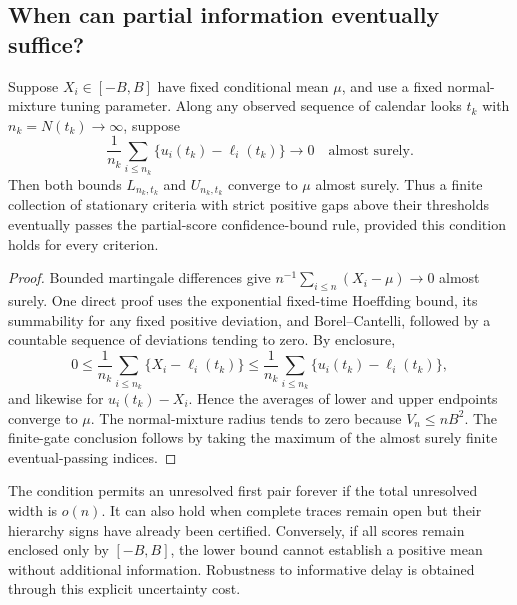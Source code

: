 \subsection{When can partial information eventually suffice?}

\begin{proposition}
\label{prop:async_consistency}
Suppose $X_i\in[-B,B]$ have fixed conditional mean $\mu$, and use a
fixed normal-mixture tuning parameter. Along any observed sequence of
calendar looks $t_k$ with $n_k=N(t_k)\to\infty$, suppose
\[
 \frac1{n_k}\sum_{i\leq n_k}
       \{u_i(t_k)-\ell_i(t_k)\}\longrightarrow0
 \quad\text{almost surely}.
\]
Then both bounds $L_{n_k,t_k}$ and $U_{n_k,t_k}$ converge to $\mu$
almost surely. Thus a finite collection of stationary criteria with
strict positive gaps above their thresholds eventually passes the
partial-score confidence-bound rule, provided this condition holds
for every criterion.
\end{proposition}
\begin{proof}
Bounded martingale differences give
$n^{-1}\sum_{i\leq n}(X_i-\mu)\to0$ almost surely. One direct proof
uses the exponential fixed-time Hoeffding bound, its summability for
any fixed positive deviation, and Borel--Cantelli, followed by a
countable sequence of deviations tending to zero. By enclosure,
\[
 0\leq\frac1{n_k}\sum_{i\leq n_k}\{X_i-\ell_i(t_k)\}
 \leq\frac1{n_k}\sum_{i\leq n_k}\{u_i(t_k)-\ell_i(t_k)\},
\]
and likewise for $u_i(t_k)-X_i$. Hence the averages of lower and upper
endpoints converge to $\mu$. The normal-mixture radius tends to zero
because $V_n\leq nB^2$. The finite-gate conclusion follows by taking
the maximum of the almost surely finite eventual-passing indices.
\end{proof}

The condition permits an unresolved first pair forever if the total
unresolved width is $o(n)$. It can also hold when complete traces remain
open but their hierarchy signs have already been certified. Conversely,
if all scores remain enclosed only by $[-B,B]$, the lower bound cannot
establish a positive mean without additional information. Robustness to
informative delay is obtained through this explicit uncertainty cost.

